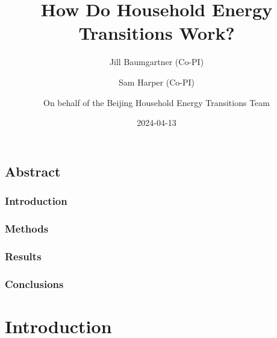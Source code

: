 \documentclass[
  letterpaper,
  DIV=11,
  numbers=noendperiod]{scrartcl}
\title{How Do Household Energy Transitions Work?}
\author{Jill Baumgartner (Co-PI) \and Sam Harper (Co-PI) \and On behalf
of the Beijing Household Energy Transitions Team}
\date{2024-04-13}
\renewcommand*\contentsname{Table of contents}
\newcommand\contentsname{Table of contents}
\begin{document}
\maketitle
\ifdefined\Shaded\renewenvironment{Shaded}{\begin{tcolorbox}[boxrule=0pt, borderline west={3pt}{0pt}{shadecolor}, sharp corners, interior hidden, frame hidden, enhanced, breakable]}{\end{tcolorbox}}\fi

\renewcommand*\contentsname{Table of contents}
{
\hypersetup{linkcolor=}
\setcounter{tocdepth}{3}
\tableofcontents
}
\hypertarget{abstract}{%
\subsection*{Abstract}\label{abstract}}

\hypertarget{introduction}{%
\subsubsection*{Introduction}\label{introduction}}

\hypertarget{methods}{%
\subsubsection*{Methods}\label{methods}}

\hypertarget{results}{%
\subsubsection*{Results}\label{results}}

\hypertarget{conclusions}{%
\subsubsection*{Conclusions}\label{conclusions}}

\hypertarget{introduction-1}{%
\section{Introduction}\label{introduction-1}}
\end{document}

